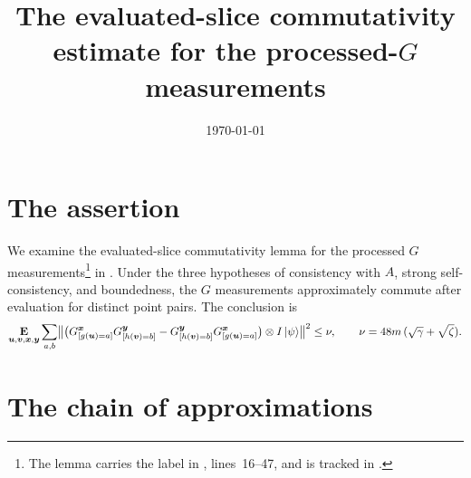 \documentclass{article}
\title{The evaluated-slice commutativity estimate for the
processed-$G$ measurements}
\author{}
\date{\today}
\begin{document}
\maketitle

\section{The assertion}

We examine the evaluated-slice commutativity lemma for the
processed $G$ measurements\footnote{The lemma carries the label
 in
, lines~16--47, and is
tracked in .}
in \cite{Ji2020LowIndividualDegree}. Under the three hypotheses of
consistency with $A$, strong self-consistency, and boundedness, the
$G$ measurements approximately commute after evaluation for distinct
point pairs. The conclusion is
\begin{equation}\label{eq:processed-conclusion}
  \mathop{\bf E\/}_{\boldsymbol{u},\boldsymbol{v},{\boldsymbol{x}},\boldsymbol{y}} \sum_{a,b}
    \bigl\|\bigl(G^{{\boldsymbol{x}}}_{[g(\boldsymbol{u})=a]} G^{\boldsymbol{y}}_{[h(\boldsymbol{v})=b]}
      - G^{\boldsymbol{y}}_{[h(\boldsymbol{v})=b]} G^{{\boldsymbol{x}}}_{[g(\boldsymbol{u})=a]}\bigr)
    \otimes I \ket{\psi}\bigr\|^{2}
  \leq 
  \nu, \qquad
  \nu = 48m\,(\sqrt{\gamma} + \sqrt{\zeta}).
\end{equation}

\section{The chain of approximations}
\end{document}
